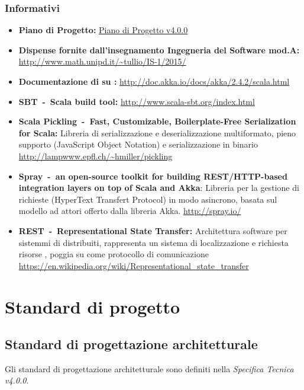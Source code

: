 \documentclass{scalatekids-article}
\begin{document}
\subsubsection{Informativi}

\begin{itemize}
\item\textbf{Piano di Progetto:} \href{run:./PianoDiProgetto\_v4.0.0.pdf}{Piano di Progetto v4.0.0}
\item\textbf{Dispense fornite dall'insegnamento Ingegneria del Software mod.A:}\\
  \url{http://www.math.unipd.it/~tullio/IS-1/2015/}
\item\textbf{Documentazione di  su :}
  \url{http://doc.akka.io/docs/akka/2.4.2/scala.html}
\item\textbf{SBT\ -\ Scala build tool:}
  \url{http://www.scala-sbt.org/index.html}
\item\textbf{Scala Pickling\ -\ Fast, Customizable, Boilerplate-Free Serialization for Scala:} Libreria di serializzazione e deserializzazione
  multiformato, pieno supporto  (JavaScript Object Notation) e
  serializzazione in binario \url{http://lampwww.epfl.ch/~hmiller/pickling}
\item\textbf{Spray\ -\ an open-source toolkit for building REST/HTTP-based integration layers on top of Scala and Akka}:
  Libreria per la gestione di richieste (HyperText Transfert Protocol) in modo asincrono, basata sul modello ad
  attori offerto dalla libreria Akka. \url{http://spray.io/}
\item\textbf{REST\ -\ Representational State Transfer:} Architettura software
  per sistemmi di  distribuiti, rappresenta un sistema di
  localizzazione e richiesta risorse , poggia su 
  come protocollo di comunicazione \url{https://en.wikipedia.org/wiki/Representational_state_transfer}
\end{itemize}

\newpage

\section{Standard di progetto}

\subsection{Standard di progettazione architetturale}
Gli standard di progettazione architetturale sono definiti nella
\textit{Specifica Tecnica v4.0.0}.
\end{document}
